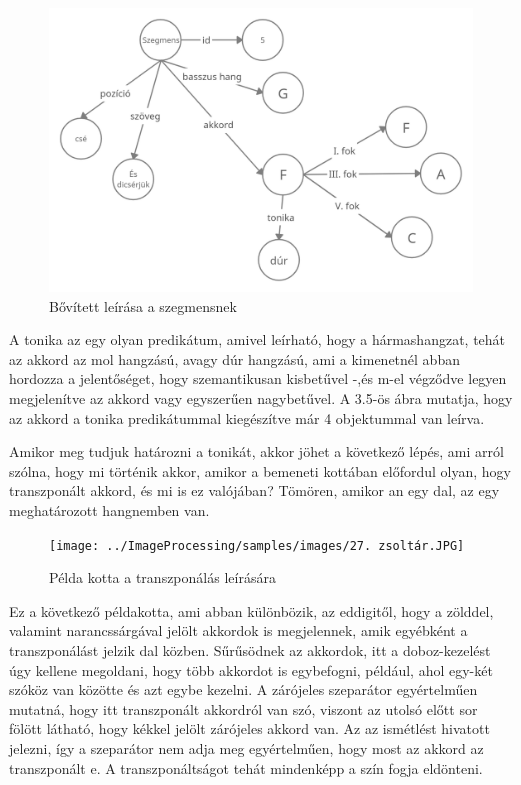 \begin{figure}[h]
	\includegraphics[scale=0.3]{images/rdf_graph_4.png}
	\caption{Bővített leírása a szegmensnek}
	\label{fig:graph4}
\end{figure}
A tonika az egy olyan predikátum, amivel leírható, hogy a hármashangzat, tehát az akkord az mol hangzású, avagy dúr hangzású, ami a kimenetnél abban hordozza a jelentőséget, hogy szemantikusan kisbetűvel -,és m-el végződve legyen megjelenítve az akkord vagy egyszerűen nagybetűvel. A 3.5-ös ábra mutatja, hogy az akkord a tonika predikátummal kiegészítve már 4 objektummal van leírva.
\par
Amikor meg tudjuk határozni a tonikát, akkor jöhet a következő lépés, ami arról szólna, hogy mi történik akkor, amikor a bemeneti kottában előfordul olyan, hogy transzponált akkord, és mi is ez valójában? Tömören, amikor an egy dal, az egy meghatározott hangnemben van.
\newpage
\begin{figure}[h]
	\texttt{[image: ../ImageProcessing/samples/images/27. zsoltár.JPG]}
	\caption{Példa kotta a transzponálás leírására}
	\label{fig:song2}
\end{figure}
Ez a következő példakotta, ami abban különbözik, az eddigitől, hogy a zölddel, valamint narancssárgával jelölt akkordok is megjelennek, amik egyébként a transzponálást jelzik dal közben. Sűrűsödnek az akkordok, itt a doboz-kezelést úgy kellene megoldani, hogy több akkordot is egybefogni, például, ahol egy-két szóköz van közötte és azt egybe kezelni. A zárójeles szeparátor egyértelműen mutatná, hogy itt transzponált akkordról van szó, viszont az utolsó előtt sor fölött látható, hogy kékkel jelölt zárójeles akkord van. Az az ismétlést hivatott jelezni, így a szeparátor nem adja meg egyértelműen, hogy most az akkord az transzponált e. A transzponáltságot tehát mindenképp a szín fogja eldönteni.

